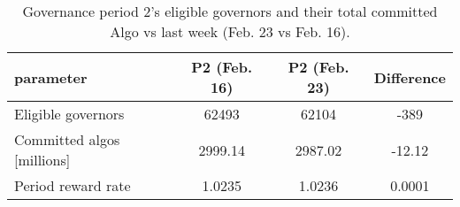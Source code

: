 %
\begin{longtable}[c]{ l c c c }
\caption{Governance period 2's eligible governors and their total committed Algo vs last week (Feb. 23 vs Feb. 16).} \\
\hline
\textbf{parameter} & \textbf{P2 (Feb. 16)} & \textbf{P2 (Feb. 23)} & \textbf{Difference} \\
\hline

Eligible governors & 62493 & 62104 & -389 \\
Committed algos [millions] & 2999.14 & 2987.02 & -12.12 \\
Period reward rate & 1.0235 & 1.0236 & 0.0001 \\
\hline
\end{longtable} 
